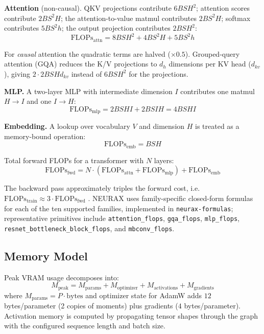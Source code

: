 \documentclass[11pt]{article}
\begin{document}
\textbf{Attention} (non-causal). QKV projections contribute $6BSH^2$; attention scores contribute $2BS^2H$; the attention-to-value matmul contributes $2BS^2H$; softmax contributes $5BS^2h$; the output projection contributes $2BSH^2$:
\begin{equation}
\mathrm{FLOPs}_{\mathrm{attn}} = 8BSH^2 + 4BS^2H + 5BS^2h
\label{eq:attn}
\end{equation}

For \emph{causal} attention the quadratic terms are halved ($\times 0.5$). Grouped-query attention (GQA) reduces the K/V projections to $d_h$ dimensions per KV head ($d_{kv}$), giving $2 \cdot 2BSH d_{kv}$ instead of $6BSH^2$ for the projections.

\textbf{MLP.} A two-layer MLP with intermediate dimension $I$ contributes one matmul $H \to I$ and one $I \to H$:
\begin{equation}
\mathrm{FLOPs}_{\mathrm{mlp}} = 2BSHI + 2BSIH = 4BSHI
\label{eq:mlp}
\end{equation}

\textbf{Embedding.} A lookup over vocabulary $V$ and dimension $H$ is treated as a memory-bound operation:
\begin{equation}
\mathrm{FLOPs}_{\mathrm{emb}} = BSH
\label{eq:emb}
\end{equation}

Total forward FLOPs for a transformer with $N$ layers:
\begin{equation}
\mathrm{FLOPs}_{\mathrm{fwd}} = N \cdot (\mathrm{FLOPs}_{\mathrm{attn}} + \mathrm{FLOPs}_{\mathrm{mlp}}) + \mathrm{FLOPs}_{\mathrm{emb}}
\label{eq:fwd}
\end{equation}

The backward pass approximately triples the forward cost, i.e.\ $\mathrm{FLOPs}_{\mathrm{train}} \approx 3 \cdot \mathrm{FLOPs}_{\mathrm{fwd}}$ \cite{kaplan2020scaling}. NEURAX uses family-specific closed-form formulas for each of the ten supported families, implemented in \texttt{neurax-formulas}; representative primitives include \texttt{attention\_flops}, \texttt{gqa\_flops}, \texttt{mlp\_flops}, \texttt{resnet\_bottleneck\_block\_flops}, and \texttt{mbconv\_flops}.

\subsection{Memory Model}

Peak VRAM usage decomposes into:
\begin{equation}
M_{\mathrm{peak}} = M_{\mathrm{params}} + M_{\mathrm{optimizer}} + M_{\mathrm{activations}} + M_{\mathrm{gradients}}
\label{eq:mem}
\end{equation}
where $M_{\mathrm{params}} = P \cdot \mathrm{bytes}$ and optimizer state for AdamW adds $12$ bytes/parameter (2 copies of moments) plus gradients ($4$ bytes/parameter). Activation memory is computed by propagating tensor shapes through the graph with the configured sequence length and batch size.
\end{document}
